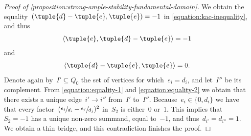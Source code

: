 \begin{proof}[Proof of \cref{proposition:strong-ample-stability-fundamental-domain}]
We obtain the equality~$(\tuple{d}-\tuple{e},\tuple{e})=-1$ in \eqref{equation:kac-inequality},
and thus\vspace*{-3pt}
\begin{equation}
\label{equation:equality-1}
\langle\tuple{e},\tuple{d}-\tuple{e}\rangle=-1
\end{equation}
and\vspace*{-3pt}
\begin{equation}
\label{equation:equality-2}
\langle\tuple{d}-\tuple{e},\tuple{e}\rangle=0.
\end{equation}
Denote again by~$I'\subseteq Q_0$ the set of vertices for which~$e_i=d_i$,
and let~$I''$ be its complement.
From \eqref{equation:equality-1} and \eqref{equation:equality-2}
we obtain that there exists a unique edge~$i'\to i''$ from~$I'$ to~$I''$.
Because~$e_i\in\{0,d_i\}$ we have that every factor~$(\sfrac{e_i}{d_i}-\sfrac{e_j}{d_j})^2$
in~$S_2$ is either~0 or~1.
This implies that~$S_2=-1$ has a unique non-zero summand,
equal to~$-1$,
and thus~$d_{i'}=d_{i''}=1$.
We obtain a thin bridge,
and this contradiction finishes the proof.
\end{proof}
